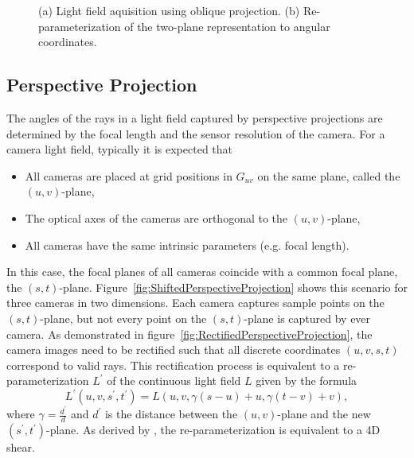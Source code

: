 \begin{figure}[tb]
	\subfigure[]{
		\centering
		
		\label{fig:ObliqueProjection}
	}
	\hfill
	\subfigure[]{
		\centering
		
		\label{fig:ObliqueProjectionReparameterization}
	}
	\caption{(a) Light field aquisition using oblique projection. (b) Re-parameterization of the two-plane representation to angular coordinates.}
\end{figure}

\subsection*{Perspective Projection}
% 
The angles of the rays in a light field captured by perspective projections are determined by the focal length and the sensor resolution of the camera.
For a camera light field, typically it is expected that
\begin{itemize}
	\item All cameras are placed at grid positions in $G_{uv}$ on the same plane, called the $(u, v)$-plane, 
	\item The optical axes of the cameras are orthogonal to the $(u, v)$-plane, 
	\item All cameras have the same intrinsic parameters (e.g. focal length).
\end{itemize}
In this case, the focal planes of all cameras coincide with a common focal plane, the $(s, t)$-plane.
Figure~\ref{fig:ShiftedPerspectiveProjection} shows this scenario for three cameras in two dimensions.
Each camera captures sample points on the $(s, t)$-plane, but not every point on the $(s, t)$-plane is captured by ever camera.
As demonstrated in figure~\ref*{fig:RectifiedPerspectiveProjection}, the camera images need to be rectified such that all discrete coordinates $(u, v, s, t)$ correspond to valid rays.
This rectification process is equivalent to a re-parameterization $L^\prime$ of the continuous light field $L$ given by the formula
\begin{equation}
	L^\prime (u, v, s^\prime, t^\prime) = L \left(u, v, \gamma (s - u) + u, \gamma (t - v) + v \right), 
\end{equation}
where $\gamma = \frac{d^\prime}{d}$ and $d^\prime$ is the distance between the $(u, v)$-plane and the new \mbox{$(s^\prime, t^\prime)$-plane}.
As derived by \cite{DynamicallyReparameterizedLF}, the re-parameterization is equivalent to a 4D shear.

